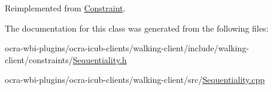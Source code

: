 \-Reimplemented from \hyperlink{classConstraint_a07453509c3f0f95034db965c9e699810}{\-Constraint}.



\-The documentation for this class was generated from the following files\-:\begin{DoxyCompactItemize}
\item 
ocra-\/wbi-\/plugins/ocra-\/icub-\/clients/walking-\/client/include/walking-\/client/constraints/\hyperlink{Sequentiality_8h}{\-Sequentiality.\-h}\item 
ocra-\/wbi-\/plugins/ocra-\/icub-\/clients/walking-\/client/src/\hyperlink{Sequentiality_8cpp}{\-Sequentiality.\-cpp}\end{DoxyCompactItemize}
